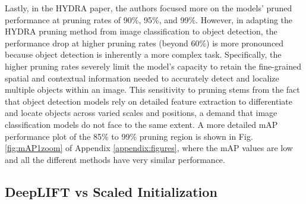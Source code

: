\documentclass[journal,onecolumn,12pt]{IEEEtran}
\begin{document}
Lastly, in the HYDRA paper, the authors focused more on the models' pruned performance at pruning rates of 90\%, 95\%, and 99\%. However, in adapting the HYDRA pruning method from image classification to object detection, the performance drop at higher pruning rates (beyond 60\%) is more pronounced because object detection is inherently a more complex task. Specifically, the higher pruning rates severely limit the model's capacity to retain the fine-grained spatial and contextual information needed to accurately detect and localize multiple objects within an image. This sensitivity to pruning stems from the fact that object detection models rely on detailed feature extraction to differentiate and locate objects across varied scales and positions, a demand that image classification models do not face to the same extent. A more detailed mAP performance plot of the 85\% to 99\% pruning region is shown in Fig. \ref{fig:mAP1zoom} of Appendix \ref{appendix:figures}, where the mAP values are low and all the different methods have very similar performance.

\subsection{DeepLIFT vs Scaled Initialization}
\label{sec1}
\end{document}
